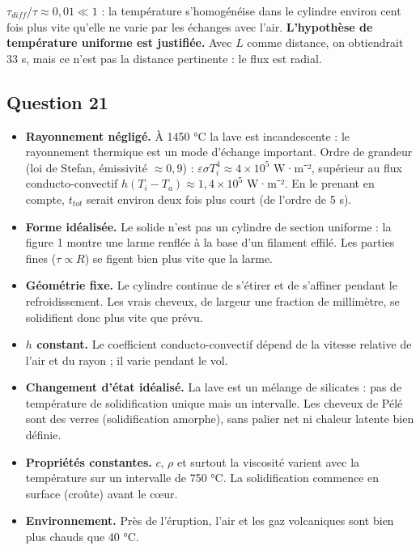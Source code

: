 \documentclass[11pt,a4paper]{article}
\providecommand{\tightlist}{\setlength{\itemsep}{0pt}\setlength{\parskip}{0pt}}
\begin{document}
\(\tau_{diff}/\tau \approx 0{,}01 \ll 1\) : la température s'homogénéise dans le cylindre environ cent fois plus vite qu'elle ne varie par les échanges avec l'air. \textbf{L'hypothèse de température uniforme est justifiée.} Avec \(L\) comme distance, on obtiendrait \(33\) s, mais ce n'est pas la distance pertinente : le flux est radial.

\hypertarget{question-21}{%
\subsection{Question 21}\label{question-21}}

\begin{itemize}
\tightlist
\item
  \textbf{Rayonnement négligé.} À 1450 °C la lave est incandescente : le rayonnement thermique est un mode d'échange important. Ordre de grandeur (loi de Stefan, émissivité \(\approx 0{,}9\)) : \(\varepsilon\sigma T_i^4 \approx 4\times10^5\) W·m⁻², supérieur au flux conducto-convectif \(h(T_i - T_a) \approx 1{,}4\times10^5\) W·m⁻². En le prenant en compte, \(t_{tot}\) serait environ deux fois plus court (de l'ordre de 5 s).
\item
  \textbf{Forme idéalisée.} Le solide n'est pas un cylindre de section uniforme : la figure 1 montre une larme renflée à la base d'un filament effilé. Les parties fines (\(\tau \propto R\)) se figent bien plus vite que la larme.
\item
  \textbf{Géométrie fixe.} Le cylindre continue de s'étirer et de s'affiner pendant le refroidissement. Les vrais cheveux, de largeur une fraction de millimètre, se solidifient donc plus vite que prévu.
\item
  \textbf{\(h\) constant.} Le coefficient conducto-convectif dépend de la vitesse relative de l'air et du rayon ; il varie pendant le vol.
\item
  \textbf{Changement d'état idéalisé.} La lave est un mélange de silicates : pas de température de solidification unique mais un intervalle. Les cheveux de Pélé sont des verres (solidification amorphe), sans palier net ni chaleur latente bien définie.
\item
  \textbf{Propriétés constantes.} \(c\), \(\rho\) et surtout la viscosité varient avec la température sur un intervalle de 750 °C. La solidification commence en surface (croûte) avant le cœur.
\item
  \textbf{Environnement.} Près de l'éruption, l'air et les gaz volcaniques sont bien plus chauds que 40 °C.
\end{itemize}
\end{document}
